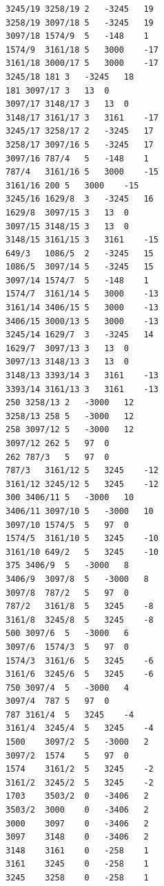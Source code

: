 \documentclass[11pt,a4paper]{article}
\begin{document}
\begin{Verbatim}[fontsize=\scriptsize]
3245/19	3258/19	2	-3245	19
3258/19	3097/18	5	-3245	19
3097/18	1574/9	5	-148	1
1574/9	3161/18	5	3000	-17
3161/18	3000/17	5	3000	-17
3245/18	181	3	-3245	18
181	3097/17	3	13	0
3097/17	3148/17	3	13	0
3148/17	3161/17	3	3161	-17
3245/17	3258/17	2	-3245	17
3258/17	3097/16	5	-3245	17
3097/16	787/4	5	-148	1
787/4	3161/16	5	3000	-15
3161/16	200	5	3000	-15
3245/16	1629/8	3	-3245	16
1629/8	3097/15	3	13	0
3097/15	3148/15	3	13	0
3148/15	3161/15	3	3161	-15
649/3	1086/5	2	-3245	15
1086/5	3097/14	5	-3245	15
3097/14	1574/7	5	-148	1
1574/7	3161/14	5	3000	-13
3161/14	3406/15	5	3000	-13
3406/15	3000/13	5	3000	-13
3245/14	1629/7	3	-3245	14
1629/7	3097/13	3	13	0
3097/13	3148/13	3	13	0
3148/13	3393/14	3	3161	-13
3393/14	3161/13	3	3161	-13
250	3258/13	2	-3000	12
3258/13	258	5	-3000	12
258	3097/12	5	-3000	12
3097/12	262	5	97	0
262	787/3	5	97	0
787/3	3161/12	5	3245	-12
3161/12	3245/12	5	3245	-12
300	3406/11	5	-3000	10
3406/11	3097/10	5	-3000	10
3097/10	1574/5	5	97	0
1574/5	3161/10	5	3245	-10
3161/10	649/2	5	3245	-10
375	3406/9	5	-3000	8
3406/9	3097/8	5	-3000	8
3097/8	787/2	5	97	0
787/2	3161/8	5	3245	-8
3161/8	3245/8	5	3245	-8
500	3097/6	5	-3000	6
3097/6	1574/3	5	97	0
1574/3	3161/6	5	3245	-6
3161/6	3245/6	5	3245	-6
750	3097/4	5	-3000	4
3097/4	787	5	97	0
787	3161/4	5	3245	-4
3161/4	3245/4	5	3245	-4
1500	3097/2	5	-3000	2
3097/2	1574	5	97	0
1574	3161/2	5	3245	-2
3161/2	3245/2	5	3245	-2
1703	3503/2	0	-3406	2
3503/2	3000	0	-3406	2
3000	3097	0	-3406	2
3097	3148	0	-3406	2
3148	3161	0	-258	1
3161	3245	0	-258	1
3245	3258	0	-258	1
\end{Verbatim}
\fi
\end{document}
